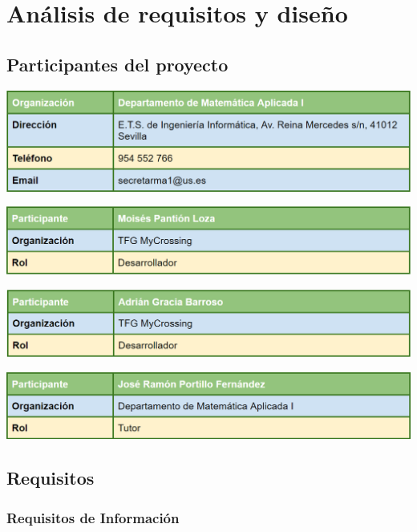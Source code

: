 \chapter{An\'alisis de requisitos y dise\~no}\label{requisitos}

\section{Participantes del proyecto}

\bigskip

\includegraphics[width=\textwidth]{img/cap5/participantes/1.png}

\bigskip

\includegraphics[width=\textwidth]{img/cap5/participantes/2.png}

\bigskip

\includegraphics[width=\textwidth]{img/cap5/participantes/3.png}

\bigskip

\includegraphics[width=\textwidth]{img/cap5/participantes/4.png}

\bigskip

\section{Requisitos}
	\subsection{Requisitos de Informaci\'on}
	
